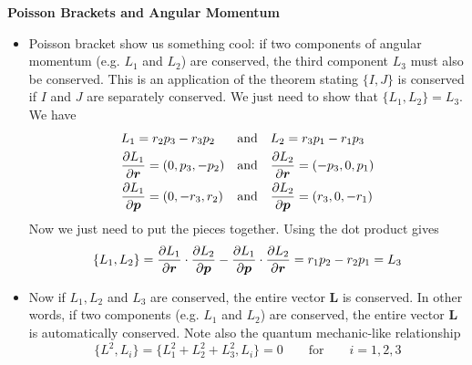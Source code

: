 \documentclass[11pt, a4paper]{article}
\newcommand{\eqtext}[1]{\qquad \text{#1} \qquad}
\begin{document}
\textbf{Poisson Brackets and Angular Momentum}
\begin{itemize}
	\item Poisson bracket show us something cool: if two components of angular momentum (e.g. $ L_{1} $ and $ L_{2} $) are conserved, the third component $ L_{3} $ must also be conserved. This is an application of the theorem stating $ \{I, J\} $ is conserved if $ I $ and $ J $ are separately conserved. We just need to show that $ \{L_{1}, L_{2}\} = L_{3}$. We have
	\begin{align*}
		&L_{1} = r_{2}p_{3} - r_{3}p_{2} && \text{and} && L_{2} = r_{3}p_{1} - r_{1}p_{3}\\
		&\pdv{L_{1}}{\bm{r}} = (0, p_{3}, -p_{2}) && \text{and} && \pdv{L_{2}}{\bm{r}} = (-p_{3},0, p_{1})\\
		&\pdv{L_{1}}{\bm{p}} = (0, -r_{3}, r_{2}) && \text{and} && \pdv{L_{2}}{\bm{p}} = (r_{3},0, -r_{1})
	\end{align*}
	Now we just need to put the pieces together. Using the dot product gives
	\begin{equation*}
		\{L_{1}, L_{2}\} = \pdv{L_{1}}{\bm{r}}\cdot \pdv{L_{2}}{\bm{p}} - \pdv{L_{1}}{\bm{p}}\cdot \pdv{L_{2}}{\bm{r}} = r_{1}p_{2} - r_{2}p_{1} = L_{3}
	\end{equation*}
	
	\item Now if $ L_{1}, L_{2} $ and $ L_{3} $ are conserved, the entire vector $ \bm{L} $ is conserved. In other words, if two components (e.g. $ L_{1} $ and $ L_{2} $) are conserved, the entire vector $ \bm{L} $ is automatically conserved. Note also the quantum mechanic-like relationship
	\begin{equation*}
		\{L^{2}, L_{i} \} = \{L_{1}^{2} + L_{2}^{2} + L_{3}^{2}, L_{i} \} = 0 \eqtext{for} i = 1, 2, 3
	\end{equation*}

\end{itemize}
\end{document}
